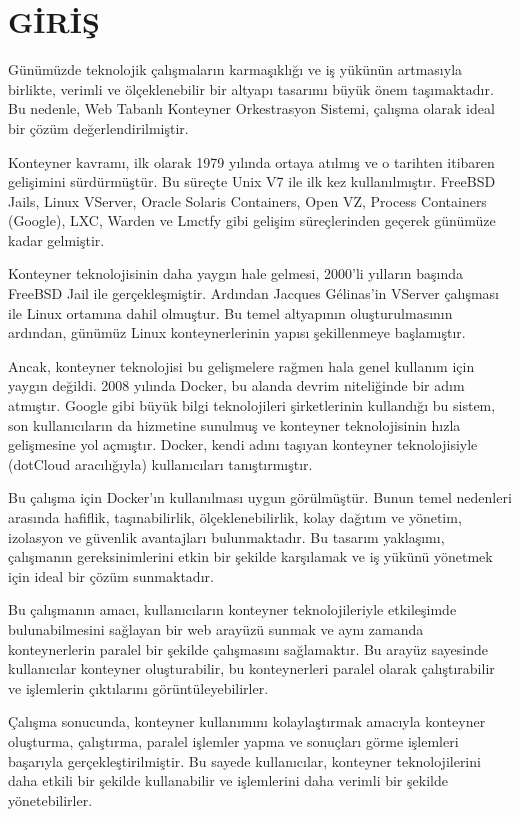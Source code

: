 \section{GİRİŞ}
Günümüzde teknolojik çalışmaların karmaşıklığı ve iş yükünün artmasıyla birlikte, verimli ve ölçeklenebilir bir altyapı tasarımı büyük önem taşımaktadır. Bu nedenle, Web Tabanlı Konteyner Orkestrasyon Sistemi, çalışma olarak ideal bir çözüm değerlendirilmiştir.

Konteyner kavramı, ilk olarak 1979 yılında ortaya atılmış ve o tarihten itibaren gelişimini sürdürmüştür. Bu süreçte Unix V7 ile ilk kez kullanılmıştır. FreeBSD Jails, Linux VServer, Oracle Solaris Containers, Open VZ, Process Containers (Google), LXC, Warden ve Lmctfy gibi gelişim süreçlerinden geçerek günümüze kadar gelmiştir.

Konteyner teknolojisinin daha yaygın hale gelmesi, 2000'li yılların başında FreeBSD Jail ile gerçekleşmiştir. Ardından Jacques Gélinas'in VServer çalışması ile Linux ortamına dahil olmuştur. Bu temel altyapının oluşturulmasının ardından, günümüz Linux konteynerlerinin yapısı şekillenmeye başlamıştır.

Ancak, konteyner teknolojisi bu gelişmelere rağmen hala genel kullanım için yaygın değildi. 2008 yılında Docker, bu alanda devrim niteliğinde bir adım atmıştır. Google gibi büyük bilgi teknolojileri şirketlerinin kullandığı bu sistem, son kullanıcıların da hizmetine sunulmuş ve konteyner teknolojisinin hızla gelişmesine yol açmıştır. Docker, kendi adını taşıyan konteyner teknolojisiyle (dotCloud aracılığıyla) kullanıcıları tanıştırmıştır.\cite{container}

Bu çalışma için Docker'ın kullanılması uygun görülmüştür. Bunun temel nedenleri arasında hafiflik, taşınabilirlik, ölçeklenebilirlik, kolay dağıtım ve yönetim, izolasyon ve güvenlik avantajları bulunmaktadır. Bu tasarım yaklaşımı, çalışmanın gereksinimlerini etkin bir şekilde karşılamak ve iş yükünü yönetmek için ideal bir çözüm sunmaktadır.

Bu çalışmanın amacı, kullanıcıların konteyner teknolojileriyle etkileşimde bulunabilmesini sağlayan bir web arayüzü sunmak ve aynı zamanda konteynerlerin paralel bir şekilde çalışmasını sağlamaktır. Bu arayüz sayesinde kullanıcılar konteyner oluşturabilir, bu konteynerleri paralel olarak çalıştırabilir ve işlemlerin çıktılarını görüntüleyebilirler.

Çalışma sonucunda, konteyner kullanımını kolaylaştırmak amacıyla konteyner oluşturma, çalıştırma, paralel işlemler yapma ve sonuçları görme işlemleri başarıyla gerçekleştirilmiştir. Bu sayede kullanıcılar, konteyner teknolojilerini daha etkili bir şekilde kullanabilir ve işlemlerini daha verimli bir şekilde yönetebilirler.

